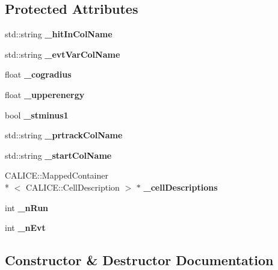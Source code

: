 \subsection*{Protected Attributes}
\begin{DoxyCompactItemize}
\item 
std\-::string {\bfseries \-\_\-hit\-In\-Col\-Name}\label{classCALICE_1_1PrimaryTrackShowerSeparator_aae37b56f486054d6bf8cc850ed2daece}

\item 
std\-::string {\bfseries \-\_\-evt\-Var\-Col\-Name}\label{classCALICE_1_1PrimaryTrackShowerSeparator_a069ad5d3e90a46ec690737055253f66f}

\item 
float {\bfseries \-\_\-cogradius}\label{classCALICE_1_1PrimaryTrackShowerSeparator_a9c1f1d8fa911ce06d1bae8ae5cd3272a}

\item 
float {\bfseries \-\_\-upperenergy}\label{classCALICE_1_1PrimaryTrackShowerSeparator_aeb52ab8ac8dd45c604e91060568d0c7d}

\item 
bool {\bfseries \-\_\-stminus1}\label{classCALICE_1_1PrimaryTrackShowerSeparator_aef0aa21e760270dfe10ab54b8500a3f3}

\item 
std\-::string {\bfseries \-\_\-prtrack\-Col\-Name}\label{classCALICE_1_1PrimaryTrackShowerSeparator_ade398526c8b1eb0bb61e38838d4e5c16}

\item 
std\-::string {\bfseries \-\_\-start\-Col\-Name}\label{classCALICE_1_1PrimaryTrackShowerSeparator_af22502ff2893f9f93a66a5b0accf0945}

\item 
C\-A\-L\-I\-C\-E\-::\-Mapped\-Container\\*
$<$ C\-A\-L\-I\-C\-E\-::\-Cell\-Description $>$ $\ast$ {\bfseries \-\_\-cell\-Descriptions}\label{classCALICE_1_1PrimaryTrackShowerSeparator_ac5fc5f57321c8c06d64504d0526edfbf}

\item 
int {\bf \-\_\-n\-Run}
\item 
int {\bf \-\_\-n\-Evt}
\end{DoxyCompactItemize}


\subsection{Constructor \& Destructor Documentation}

